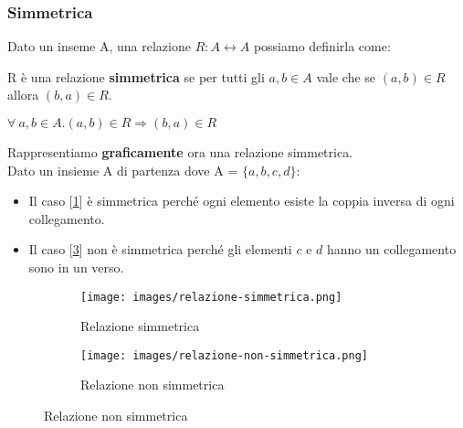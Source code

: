 \subsubsection{Simmetrica}
Dato un inseme A, una relazione $R: A \longleftrightarrow A$ possiamo definirla come:
\begin{definition}[Simmetrica]
    R è una relazione \textbf{simmetrica} se per tutti gli $a,b \in A$ vale che se $(a, b) \in R$ allora $(b,a) \in R$.
    \begin{center}
        $\forall \: a,b \in A . (a, b) \in R \Longrightarrow (b,a) \in R$
    \end{center}
\end{definition}
Rappresentiamo \textbf{graficamente} ora una relazione simmetrica. \\Dato un insieme A di partenza dove A = $\{a, b, c, d\}$:
\begin{itemize}
    \item Il caso [\ref{fig:relazione-simmetrica}] è simmetrica perché ogni elemento esiste la coppia inversa di ogni collegamento.
    \item Il caso [\ref{fig:relazione-non-simmetrica}] non è simmetrica perché gli elementi $c$ e $d$ hanno un collegamento sono in un verso.
\end{itemize}
\begin{figure}[h!]
    \vspace{-10pt}
    \centering
    \begin{subfigure}{.3\textwidth}
        \centering
        \texttt{[image: images/relazione-simmetrica.png]}
        \caption{Relazione simmetrica}
        \label{fig:relazione-simmetrica}
    \end{subfigure}
    \hspace{1.5cm}
    \begin{subfigure}{.3\textwidth}
        \centering
        \texttt{[image: images/relazione-non-simmetrica.png]}
        \caption{Relazione non simmetrica}
        \label{fig:relazione-non-simmetrica}
    \end{subfigure}
\end{figure}
